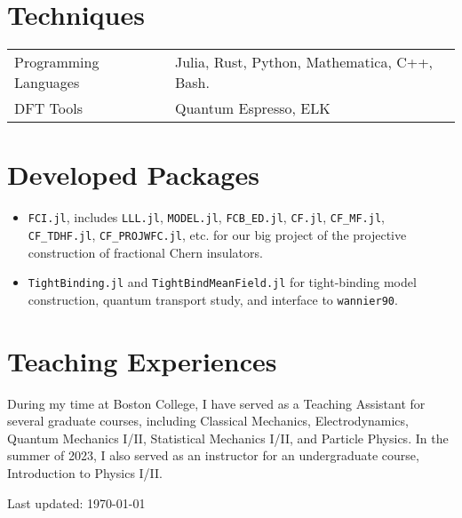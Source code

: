 \documentclass[10pt, letterpaper]{article}
\begin{document}
\section*{Techniques}
    \begin{tabular}{ll}
        Programming Languages & Julia, Rust, Python, Mathematica, C++, Bash.\\
        DFT Tools & Quantum Espresso, ELK\\
    \end{tabular}

\section*{Developed Packages}
    \begin{itemize}
        \item \texttt{FCI.jl}, includes \texttt{LLL.jl}, \texttt{MODEL.jl}, \texttt{FCB\_ED.jl}, \texttt{CF.jl}, \texttt{CF\_MF.jl}, \texttt{CF\_TDHF.jl}, \texttt{CF\_PROJWFC.jl}, etc. for our big project of the projective construction of fractional Chern insulators.
        \item \texttt{TightBinding.jl} and \texttt{TightBindMeanField.jl} for tight-binding model construction, quantum transport study, and interface to \texttt{wannier90}.
    \end{itemize}



\section*{Teaching Experiences}
    During my time at Boston College, I have served as a Teaching Assistant for several graduate courses, including Classical Mechanics, Electrodynamics, Quantum Mechanics I/II, Statistical Mechanics I/II, and Particle Physics. In the summer of 2023, I also served as an instructor for an undergraduate course, Introduction to Physics I/II.



\begin{center}
  \begin{footnotesize}
    Last updated: \today 
  \end{footnotesize}
\end{center}
\end{document}
